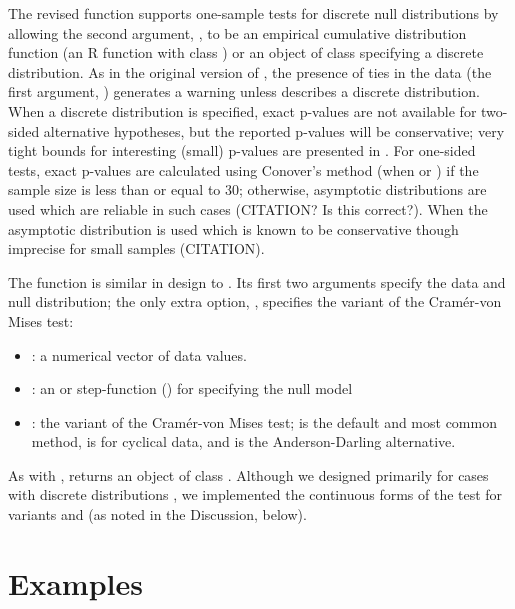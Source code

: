The revised  function supports one-sample tests for discrete
null distributions by allowing the second argument, , to be
an empirical cumulative distribution function (an R function
with class ) or an object of class  specifying
a discrete distribution.  As in the original version of ,
the presence of ties in the data (the first argument, ) generates a
warning unless  describes a discrete distribution.  When a discrete
distribution is specified, exact p-values are not available for 
two-sided alternative hypotheses, but the reported p-values will be
conservative; very tight bounds for interesting (small) p-values are
presented in \cite{Conover1972}.  For one-sided tests,
exact p-values are calculated using Conover's
method (when  or )
if the sample size is less than or equal to 30; otherwise, asymptotic distributions
are used which are reliable in such cases (CITATION? Is this correct?).
When  the asymptotic distribution is used which is known
to be conservative though imprecise for small samples (CITATION).


The function  is similar in design
to .  Its first two
arguments specify the data and null distribution; the only extra option,
, specifies the variant of the Cram\'{e}r-von Mises test:
\begin{itemize}
\item {}: a numerical vector of data values.
\item {}: an  or step-function () for specifying
the null model
\item {}: the variant of the Cram\'{e}r-von Mises test; 
is the default and most common method,  is for cyclical data,
and  is the Anderson-Darling alternative.
\end{itemize}
As with ,  returns an object of class 
.  Although we designed  primarily for cases with
discrete distributions , we implemented the continuous forms of the
test for variants  and  (as noted in the Discussion, below).

 
\section{Examples}

